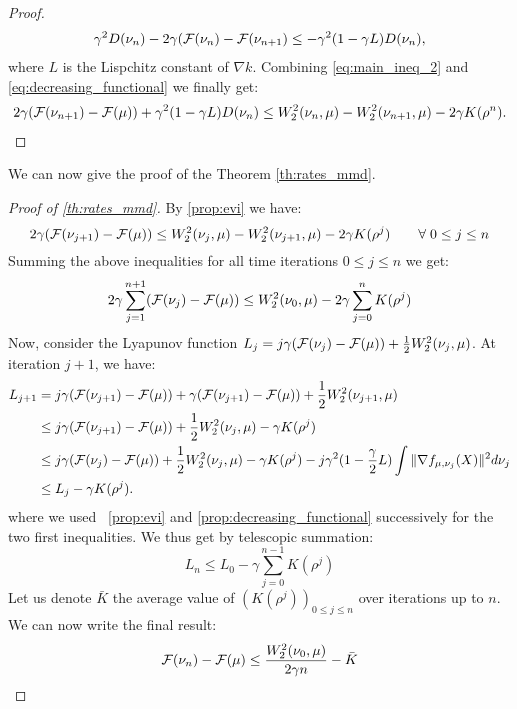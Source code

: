 \begin{proof}
	\begin{align}
	\gamma^2 D(\nu_n) -2\gamma ({{\mathcal F}}(\nu_n)-{{\mathcal F}}(\nu_{n+1})\leq -\gamma^2 (1-\gamma L)D(\nu_n),
	\label{eq:decreasing_functional}
	\end{align}
	where $L$ is the Lispchitz constant of $\nabla k$. Combining  \cref{eq:main_ineq_2} and \cref{eq:decreasing_functional} we finally get:
	\begin{align}
	2\gamma({{\mathcal F}}(\nu_{n+1})-{{\mathcal F}}(\mu))+\gamma^2(1-\gamma L)D(\nu_n)
	\leq 
	W_2^2(\nu_n,\mu)-W_2^2(\nu_{n+1},\mu)-2\gamma K(\rho^n).
	\label{eq:main_final}
	\end{align}
\end{proof}

We can now give the proof of the Theorem \cref{th:rates_mmd}.

\begin{proof}[Proof of \cref{th:rates_mmd}]\label{proof:th:rates_mmd}
	By \cref{prop:evi} we have:
	\[
	2\gamma({{\mathcal F}}(\nu_{j+1})-{{\mathcal F}}(\mu))
\leq 
W_2^2(\nu_j,\mu)-W_2^2(\nu_{j+1},\mu)-2\gamma K(\rho^j) \qquad \forall \; 0 \leq j\leq n 
	\]
	 Summing the above inequalities for all time iterations $0 \le j \le n$ we get:
	\begin{align}
	2\gamma \sum_{j=1}^{n+1} ({{\mathcal F}}(\nu_{j}) - {{\mathcal F}}(\mu)) \leq W_2^2(\nu_0,\mu) - 2\gamma \sum_{j=0}^n K(\rho^j)
	\end{align} %
	Now, consider the Lyapunov function $L_j = j \gamma ({{\mathcal F}}(\nu_j) - {{\mathcal F}}(\mu)) + \frac12 W_2^2(\nu_j,\mu)$. At iteration $j+1$, we have:
	\begin{align*}
	L_{j+1} &= j\gamma({{\mathcal F}}(\nu_{j+1}) - {{\mathcal F}}(\mu)) + \gamma({{\mathcal F}}(\nu_{j+1}) - {{\mathcal F}}(\mu)) + \frac12 W_2^2(\nu_{j+1},\mu)\\
	&\leq j\gamma({{\mathcal F}}(\nu_{j+1}) - {{\mathcal F}}(\mu)) + \frac12 W_2^2(\nu_j,\mu)-\gamma K(\rho^j)\\
	&\leq j\gamma({{\mathcal F}}(\nu_{j}) - {{\mathcal F}}(\mu)) + \frac12 W_2^2(\nu_j,\mu)-\gamma K(\rho^j) -j\gamma^2 (1-\frac{\gamma}{2}L )\int \Vert \nabla f_{\mu, \nu_j}(X)\Vert^2 d\nu_j \\
	&\leq  L_j - \gamma K(\rho^j).
	\end{align*}
	where we used ~\cref{prop:evi} and \cref{prop:decreasing_functional} successively for the two first inequalities. We thus get by telescopic summation: 
	\begin{equation}
	 L_n \leq L_0 -\gamma \sum_{j = 0}^{n-1} K(\rho^j)
	\end{equation}
		Let us denote $\bar{K}$ the average value of $(K(\rho^j))_{0\leq j \leq n}$ over iterations up to $n$. We can now write the final result:
	\begin{equation}
	{{\mathcal F}}(\nu_{n}) - {{\mathcal F}}(\mu) \leq \frac{W_2^2(\nu_0, \mu)}{2 \gamma n} -\bar{K}
	\end{equation}
\end{proof}





